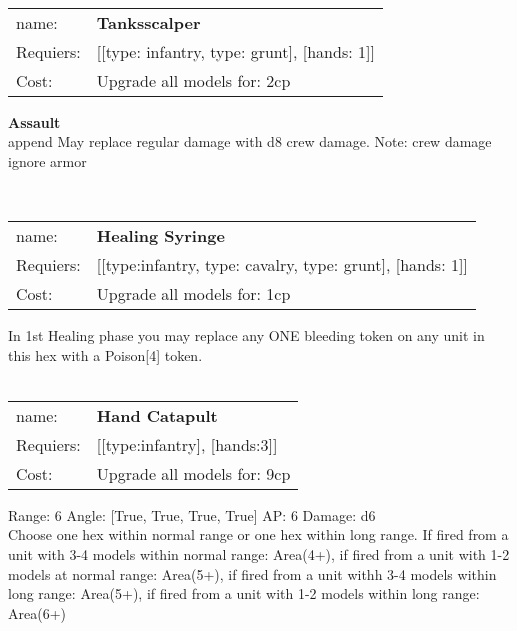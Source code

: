 \ \\
\begin{tabular}{ll}
name: & {\bf Tanksscalper } \\
Requiers: & [[type: infantry, type: grunt], [hands: 1]] \\
Cost: & Upgrade all models for: 2cp \\
\end{tabular}





{\bf Assault} \ \\

append May replace regular damage with d8 crew damage. Note: crew damage ignore armor


\ \\
\begin{tabular}{ll}
name: & {\bf Healing Syringe } \\
Requiers: & [[type:infantry, type: cavalry, type: grunt], [hands: 1]] \\
Cost: & Upgrade all models for: 1cp \\
\end{tabular}

In 1st Healing phase you may replace any ONE bleeding token on any unit in this hex with a Poison[4] token.\\ 









\ \\
\begin{tabular}{ll}
name: & {\bf Hand Catapult } \\
Requiers: & [[type:infantry], [hands:3]] \\
Cost: & Upgrade all models for: 9cp \\
\end{tabular}



Range: 6  Angle: [True, True, True, True] AP: 6 Damage: d6 \\
Choose one hex within normal range or one hex within long range. If fired from a unit with 3-4 models within normal range: Area(4+), if fired from a unit with 1-2 models at normal range: Area(5+), if fired from a unit withh 3-4 models within long range: Area(5+), if fired from a unit with 1-2 models within long range: Area(6+)\\ 








